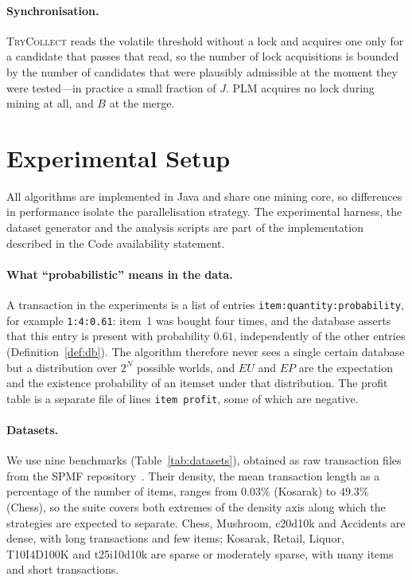 \documentclass[pdflatex,sn-vancouver-num]{sn-jnl}
\theoremstyle{thmstyleone}%
\theoremstyle{thmstyletwo}%
\theoremstyle{thmstylethree}%
\newcommand{\EU}{\mathit{EU}}
\newcommand{\EP}{\mathit{EP}}
\begin{document}
\paragraph{Synchronisation.} \textsc{TryCollect} reads the volatile
threshold without a lock and acquires one only for a candidate that
passes that read, so the number of lock acquisitions is bounded by the
number of candidates that were plausibly admissible at the moment they
were tested---in practice a small fraction of $J$. PLM acquires no lock
during mining at all, and $B$ at the merge.

\FloatBarrier
\section{Experimental Setup}\label{sec:setup}
All algorithms are implemented in Java and share one mining core, so
differences in performance isolate the parallelisation strategy. The
experimental harness, the dataset generator and the analysis scripts are
part of the implementation described in the Code availability statement.
 
\paragraph{What ``probabilistic'' means in the data.}
A transaction in the experiments is a list of entries
\texttt{item:quantity:probability}, for example \texttt{1:4:0.61}: item~1
was bought four times, and the database asserts that this entry is present
with probability $0.61$, independently of the other entries
(Definition~\ref{def:db}). The algorithm therefore never sees a single
certain database but a distribution over $2^{N}$ possible worlds, and
$\EU$ and $\EP$ are the expectation and the existence probability of an
itemset under that distribution. The profit table is a separate file of
lines \texttt{item profit}, some of which are negative.

\paragraph{Datasets.}
We use nine benchmarks (Table~\ref{tab:datasets}), obtained as raw
transaction files from the SPMF repository~\cite{fournierviger2014spmf}.
Their density, the mean transaction length as a percentage of the number
of items, ranges from $0.03\%$ (Kosarak) to $49.3\%$ (Chess), so the
suite covers both extremes of the density axis along which the strategies
are expected to separate. Chess, Mushroom, c20d10k and Accidents are
dense, with long transactions and few items; Kosarak, Retail, Liquor,
T10I4D100K and t25i10d10k are sparse or moderately sparse, with many items and
short transactions.
\end{document}
